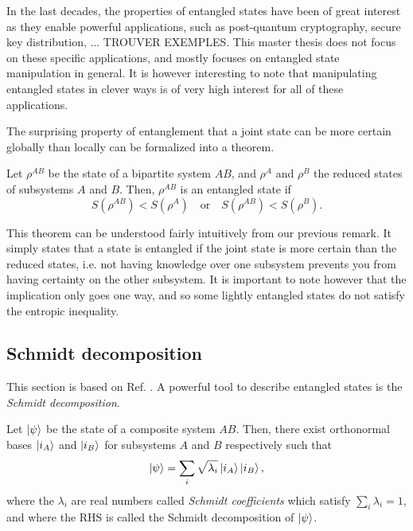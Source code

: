 In the last decades, the properties of entangled states have been of great interest as they enable powerful applications, such as post-quantum cryptography, secure key distribution, ... TROUVER EXEMPLES. This master thesis does not focus on these specific applications, and mostly focuses on entangled state manipulation in general. It is however interesting to note that manipulating entangled states in clever ways is of very high interest for all of these applications.

The surprising property of entanglement that a joint state can be more certain globally than locally can be formalized into a theorem.

\begin{theorem} \label{th:entropic_criterion}
    Let $\rho^{AB}$ be the state of a bipartite system $AB$, and $\rho^A$ and $\rho^B$ the reduced states of subsystems $A$ and $B$. Then, $\rho^{AB}$ is an entangled state if 
    \begin{equation}
        S(\rho^{AB}) < S(\rho^A) \quad \text{or} \quad S(\rho^{AB}) < S(\rho^B).
    \end{equation}
\end{theorem}

This theorem can be understood fairly intuitively from our previous remark. It simply states that a state is entangled if the joint state is more certain than the reduced states, i.e. not having knowledge over one subsystem prevents you from having certainty on the other subsystem. It is important to note however that the implication only goes one way, and so some lightly entangled states do not satisfy the entropic inequality.



\subsection{Schmidt decomposition} \label{sec:schmidt}

This section is based on Ref. \cite[pp. 109-111]{nielsen_quantum_2010}. A powerful tool to describe entangled states is the \textit{Schmidt decomposition}.

\begin{theorem}
    Let $\ket{\psi}$ be the state of a composite system $AB$. Then, there exist orthonormal bases $\ket{i_A}$ and $\ket{i_B}$ for subsystems $A$ and $B$ respectively such that
    \begin{equation}
        \ket{\psi} = \sum_i \sqrt{\lambda_i} \ket{i_A} \ket{i_B},
    \end{equation}
    where the $\lambda_i$ are real numbers called \textit{Schmidt coefficients} which satisfy $\sum_i \lambda_i = 1$, and where the RHS is called the Schmidt decomposition of $\ket{\psi}$.
\end{theorem}


